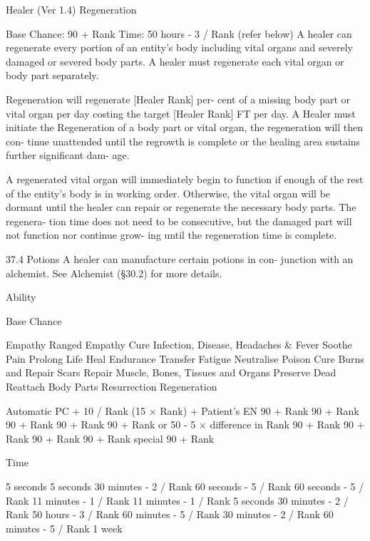 \begin{Chapter}{Healer (Ver 1.4)}
Regeneration 

Base Chance: 90 + Rank 
Time: 50 hours - 3 / Rank (refer below) 
A healer can regenerate every portion of an entity’s 
body  including  vital  organs  and  severely  damaged 
or  severed  body  parts.  A  healer  must  regenerate 
each vital organ or body part separately. 

Regeneration  will  regenerate  [Healer  Rank]  per-
cent  of  a  missing  body  part  or  vital  organ  per  day 
costing  the  target  [Healer  Rank]  FT  per  day.  A 
Healer  must  initiate  the  Regeneration  of  a  body 
part  or  vital  organ,  the  regeneration will  then con-
tinue  unattended  until  the  regrowth  is  complete  or 
the  healing  area  sustains  further  significant  dam-
age. 

A  regenerated  vital  organ  will  immediately  begin 
to  function  if  enough  of  the  rest  of  the  entity’s 
body  is  in  working  order.  Otherwise,  the  vital 
organ will be dormant until the healer can repair or 
regenerate the necessary body parts. The regenera-
tion  time  does  not  need  to  be  consecutive,  but  the 
damaged part will not function nor continue grow-
ing until the regeneration time is complete. 

37.4 Potions 
A  healer  can  manufacture  certain  potions  in  con-
junction  with  an  alchemist.  See  Alchemist  (§30.2) 
for more details. 

Ability 

Base Chance 

Empathy 
Ranged Empathy 
Cure Infection, Disease, Headaches \& Fever 
Soothe Pain  
Prolong Life  
Heal Endurance  
Transfer Fatigue 
Neutralise Poison 
Cure Burns and Repair Scars 
Repair Muscle, Bones, Tissues and Organs 
Preserve Dead  
Reattach Body Parts  
Resurrection  
Regeneration 
 

 

Automatic 
PC + 10 / Rank 
(15 × Rank) + Patient’s EN 
90 + Rank 
90 + Rank 
90 + Rank 
90 + Rank 
90 + Rank or 50 - 5 × difference in Rank 
90 + Rank 
90 + Rank 
90 + Rank 
90 + Rank  
special 
90 + Rank 

Time 

5 seconds 
5 seconds 
30 minutes - 2 / Rank 
60 seconds - 5 / Rank 
60 seconds - 5 / Rank 
11 minutes - 1 / Rank 
11 minutes - 1 / Rank 
5 seconds 
30 minutes - 2 / Rank 
50 hours - 3 / Rank 
60 minutes - 5 / Rank 
30 minutes - 2 / Rank 
60 minutes - 5 / Rank 
1 week 

\end{Chapter}

